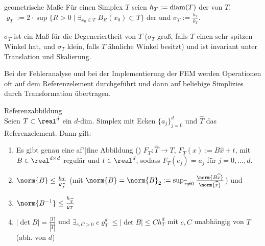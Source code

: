 \linie

\begin{Def}{geometrische Maße}
    Für einen Simplex $T$ seien
    $h_T := \operatorname{diam}(T)$ der  von $T$,
    $\varrho_T := 2 \cdot \sup\{R > 0 \;|\; \exists_{x_0 \in T}\; B_R(x_0) \subset T\}$
    der  und
    $\sigma_T := \frac{h_T}{\varrho_T}$.
\end{Def}

\begin{Bem}
    $\sigma_T$ ist ein Maß für die Degeneriertheit von $T$
    ($\sigma_T$ groß, falls $T$ einen sehr spitzen Winkel hat,
    und $\sigma_T$ klein, falls $T$ ähnliche Winkel besitzt)
    und ist invariant unter Translation und Skalierung.
\end{Bem}

\linie

\begin{Bem}
    Bei der Fehleranalyse und bei der Implementierung der FEM werden Operationen
    oft auf dem Referenzelement durchgeführt und dann auf
    beliebige Simplizies durch Transformation übertragen.
\end{Bem}

\begin{Satz}{Referenzabbildung}\\
    Seien $T \subset \real^d$ ein $d$-dim. Simplex mit Ecken $\{a_j\}_{j=0}^d$ und
    $\widehat{T}$ das Referenzelement.
    Dann gilt:
    \begin{enumerate}
        \item
        Es gibt genau eine af"|fine Abbildung ()
        $F_T\colon \widehat{T} \to T$,
        $F_T(\widehat{x}) := B\widehat{x} + t$,
        mit $B \in \real^{d \times d}$ regulär und $t \in \real^d$,
        sodass $F_T(e_j) = a_j$ für $j = 0, \dotsc, d$.

        \item
        $\norm{B} \le \frac{h_T}{\varrho_{\widehat{T}}}$
        (mit $\norm{B} = \norm{B}_2 := \sup_{\widehat{x}\not=0}
        \frac{\norm{B\widehat{x}}}{\norm{\widehat{x}}}$) und

        \item
        $\norm{B^{-1}} \le \frac{h_{\widehat{T}}}{\varrho_T}$

        \item
        $|\det B| = \frac{|T|}{|\widehat{T}|}$ und
        $\exists_{c, C > 0}\; c\varrho_T^d \le |\det B| \le Ch_T^d$
        mit $c, C$ unabhängig von $T$ (abh. von $d$)
    \end{enumerate}
\end{Satz}

